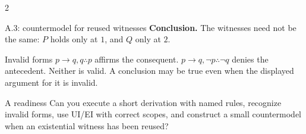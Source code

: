 \documentclass[10pt]{article}
\begin{document}
\begin{multicols}{2}
\begin{workedbox}{A.3: countermodel for reused witnesses}
\textbf{Conclusion.} The witnesses need not be the same: $P$ holds only at $1$, and $Q$ only at $2$.
\end{workedbox}

\begin{warningbox}{Invalid forms}
$p\to q,q\therefore p$ affirms the consequent. $p\to q,\neg p\therefore
\neg q$ denies the antecedent. Neither is valid. A conclusion may be true even
when the displayed argument for it is invalid.
\end{warningbox}

\begin{checklistbox}{A readiness}
Can you execute a short derivation with named rules, recognize invalid forms,
use UI/EI with correct scopes, and construct a small countermodel when an
existential witness has been reused?
\end{checklistbox}
\end{multicols}

\clearpage
\end{document}
